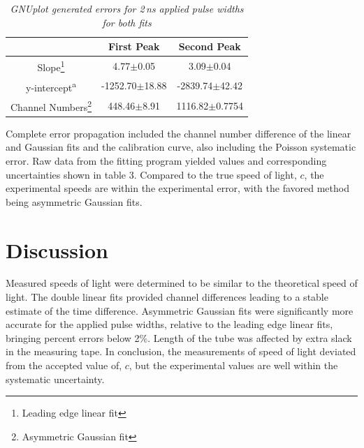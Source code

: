 \documentclass[aps,prl,twocolumn,superscriptaddress,nofootinbib]{revtex4-1}
\begin{document}
\begin{savenotes}
\begin{table}[h!] 
\caption{\it GNUplot generated errors for 2\,ns applied pulse widths for both fits}
\label{t1}   %
 \begin{center}   %
    \begin{tabular}{|c|c|c|} \hline   %

          & First Peak  & Second Peak        \\ \hline
Slope\footnote{Leading edge linear fit}    & 4.77$\pm$0.05  & 3.09$\pm$0.04      \\ \hline
y-intercept\textsuperscript{a} & -1252.70$\pm$18.88 &   -2839.74$\pm$42.42  \\ \hline
Channel Numbers\footnote[2]{Asymmetric Gaussian fit}   & 448.46$\pm$8.91   & 1116.82$\pm$0.7754       \\ \hline



     \end{tabular}
  \end{center}
\end{table}
\end{savenotes}

\indent Complete error propagation included the channel number difference of the linear and Gaussian fits and the calibration curve, also including the Poisson systematic error. Raw data from the fitting program yielded values and corresponding uncertainties shown in table 3. Compared to the true speed of light, $c$, the experimental speeds are within the experimental error, with the favored method being asymmetric Gaussian fits.


\section{Discussion}

Measured speeds of light were determined to be similar to the theoretical speed of light. The double linear fits provided channel differences leading to a stable estimate of the time difference. Asymmetric Gaussian fits were significantly more accurate for the applied pulse widths, relative to the leading edge linear fits, bringing percent errors below 2\%. Length of the tube was affected by extra slack in the measuring tape. In conclusion, the measurements of speed of light deviated from the accepted value of, $c$, but the experimental values are well within the systematic uncertainty.
\end{document}
